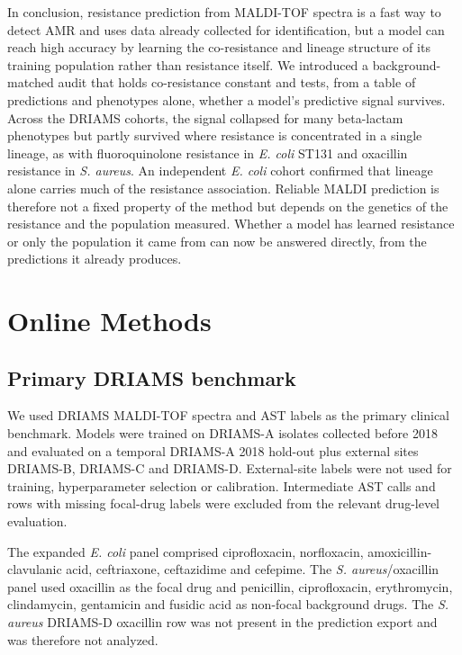 \documentclass[11pt]{article}
\begin{document}
In conclusion, resistance prediction from MALDI-TOF spectra is a fast way to detect AMR and uses data already collected for identification, but a model can reach high accuracy by learning the co-resistance and lineage structure of its training population rather than resistance itself. We introduced a background-matched audit that holds co-resistance constant and tests, from a table of predictions and phenotypes alone, whether a model's predictive signal survives. Across the DRIAMS cohorts, the signal collapsed for many beta-lactam phenotypes but partly survived where resistance is concentrated in a single lineage, as with fluoroquinolone resistance in \textit{E. coli} ST131 and oxacillin resistance in \textit{S. aureus}. An independent \textit{E. coli} cohort confirmed that lineage alone carries much of the resistance association. Reliable MALDI prediction is therefore not a fixed property of the method but depends on the genetics of the resistance and the population measured. Whether a model has learned resistance or only the population it came from can now be answered directly, from the predictions it already produces.

\section*{Online Methods}

\subsection*{Primary DRIAMS benchmark}

We used DRIAMS MALDI-TOF spectra and AST labels as the primary clinical benchmark\cite{weis2022driams,driamsdryad}. Models were trained on DRIAMS-A isolates collected before 2018 and evaluated on a temporal DRIAMS-A 2018 hold-out plus external sites DRIAMS-B, DRIAMS-C and DRIAMS-D. External-site labels were not used for training, hyperparameter selection or calibration. Intermediate AST calls and rows with missing focal-drug labels were excluded from the relevant drug-level evaluation.

The expanded \textit{E. coli} panel comprised ciprofloxacin, norfloxacin, amoxicillin-clavulanic acid, ceftriaxone, ceftazidime and cefepime. The \textit{S. aureus}/oxacillin panel used oxacillin as the focal drug and penicillin, ciprofloxacin, erythromycin, clindamycin, gentamicin and fusidic acid as non-focal background drugs. The \textit{S. aureus} DRIAMS-D oxacillin row was not present in the prediction export and was therefore not analyzed.
\end{document}
